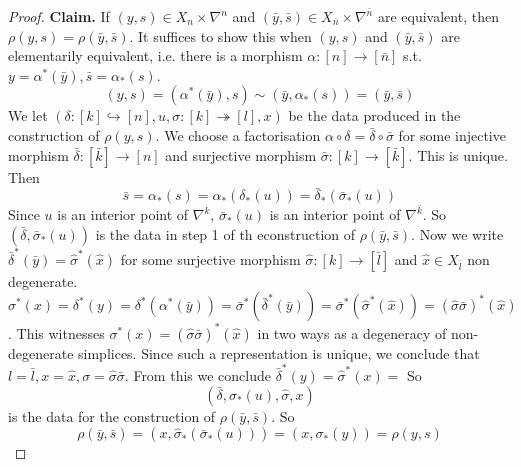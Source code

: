 \documentclass[language=english]{TemplateLecture}
\begin{document}
\begin{proof}
    \textbf{Claim.} If \((y,s)\in X_n\times \nabla^n\) and \((\bar y, \bar s) \in X_{\bar n} \times \nabla^{\bar n}\) are equivalent, then \(\rho(y,s) = \rho(\bar y, \bar s)\). It suffices to show this when \((y,s)\) and \((\bar y, \bar s)\) are elementarily equivalent, i.e. there is a morphism \(\alpha\colon [n]\to [\bar n]\) s.t. \(y = \alpha^*(\bar y), \bar s = \alpha_*(s)\).
    \[(y,s) = (\alpha^*(\bar y), s) \sim (\bar y, \alpha_*(s)) = (\bar y, \bar s)\]
    We let \((\delta\colon [k]\hookrightarrow[n], u, \sigma\colon [k]\twoheadrightarrow[l], x)\) be the data produced in the construction of \(\rho(y,s)\). We choose a factorisation \(\alpha\circ \delta = \bar \delta\circ \bar\sigma\) for some injective morphism \(\bar\delta \colon [\bar k] \to [n]\) and surjective morphism \(\bar \sigma\colon [k]\to [\bar k]\). This is unique. Then
    \[\bar s = \alpha_*(s) = \alpha_*(\delta_*(u)) = \bar \delta_*(\bar\sigma_*(u))\]
    Since \(u\) is an interior point of \(\nabla^k\), \(\bar\sigma_*(u)\) is an interior point of \(\nabla^{\bar k}\). So \((\bar\delta, \bar \sigma_*(u))\) is the data in step 1 of th econstruction of \(\rho(\bar y, \bar s)\). Now we write \(\bar \delta^*(\bar y) = \hat\sigma^*(\hat x)\) for some surjective morphism \(\hat \sigma\colon [k]\to [\bar l]\) and \(\hat x \in X_{\bar l}\) non degenerate. \(\sigma^*(x) = \delta^*(y)= \delta^*(\alpha^*(\bar y)) = \bar\sigma^*(\bar \delta^*(\bar y)) = \bar \sigma^*(\hat\sigma^*(\hat x)) = (\hat \sigma \bar \sigma)^*(\hat x)\). This witnesses \(\sigma^*(x) = (\hat \sigma\bar\sigma)^*(\hat x)\) in two ways as a degeneracy of non-degenerate simplices. Since such a representation is unique, we conclude that \(l = \bar l, x = \hat x, \sigma = \hat \sigma\bar \sigma\). From this we conclude \(\bar \delta^*(y) = \hat\sigma^*(x) = \) So
    \[(\bar \delta, \sigma_*(u), \hat \sigma, x)\]
    is the data for the construction of \(\rho(\bar y, \bar s)\). So
    \[\rho(\bar y,\bar s) = (x,\hat\sigma_*(\bar\sigma_*(u))) = (x, \sigma_*(y)) = \rho(y,s)\]


\end{proof}
\end{document}
